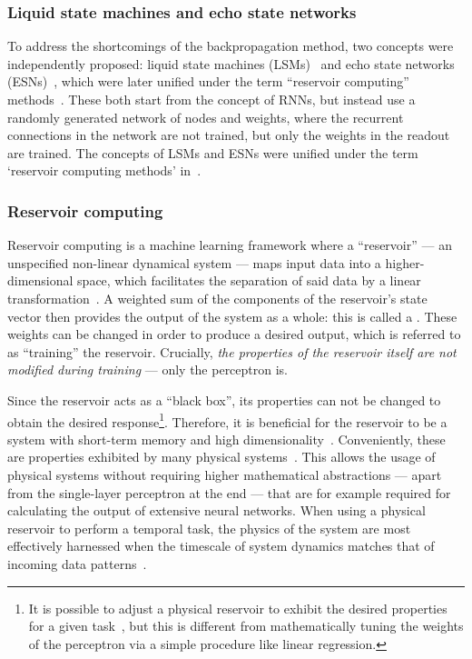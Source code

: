 \subsubsection{Liquid state machines and echo state networks}
To address the shortcomings of the backpropagation method, two concepts were independently proposed: liquid state machines (LSMs)~\cite{maass_LSM} and echo state networks (ESNs)~\cite{jaeger2001echo}, which were later unified under the term ``reservoir computing'' methods~\cite{RC_unification}.
These both start from the concept of RNNs, but instead use a randomly generated network of nodes and weights, where the recurrent connections in the network are not trained, but only the weights in the readout are trained.
The concepts of LSMs and ESNs were unified under the term `reservoir computing methods' in~\cite{RC_unification}.

\subsubsection{Reservoir computing}
Reservoir computing is a machine learning framework where a ``reservoir'' --- an unspecified non-linear dynamical system --- maps input data into a higher-dimensional space, which facilitates the separation of said data by a linear transformation~\cite{KUR-24}.
A weighted sum of the components of the reservoir's state vector then provides the output of the system as a whole: this is called a . %
These weights can be changed in order to produce a desired output, which is referred to as ``training'' the reservoir.
Crucially, \textit{the properties of the reservoir itself are not modified during training} --- only the perceptron is. \par
Since the reservoir acts as a ``black box'', its properties can not be changed to obtain the desired response\footnote{
	It is possible to adjust a physical reservoir to exhibit the desired properties for a given task~\cite{AdaptiveProgrammableRC,gartside2022reconfigurable}, but this is different from mathematically tuning the weights of the perceptron via a simple procedure like linear regression.
}.
Therefore, it is beneficial for the reservoir to be a system with short-term memory and high dimensionality~\cite{NeuromorphicAFMspintronics,RC_RecentAdvances}.
Conveniently, these are properties exhibited by many physical systems~\cite{RC_DipoleNanomagnets,RC_PassiveFrustratedNM,RC_ASI,RC_RecentAdvances,NeuromorphicOscillators,VowelRecognition4STO,RC_DiffusiveMemristors,RC_MemristorTemporal,gartside2022reconfigurable}.
This allows the usage of physical systems without requiring higher mathematical abstractions --- apart from the single-layer perceptron at the end --- that are for example required for calculating the output of extensive neural networks.
When using a physical reservoir to perform a temporal task, the physics of the system are most effectively harnessed when the timescale of system dynamics matches that of incoming data patterns~\cite{KUR-24}.

